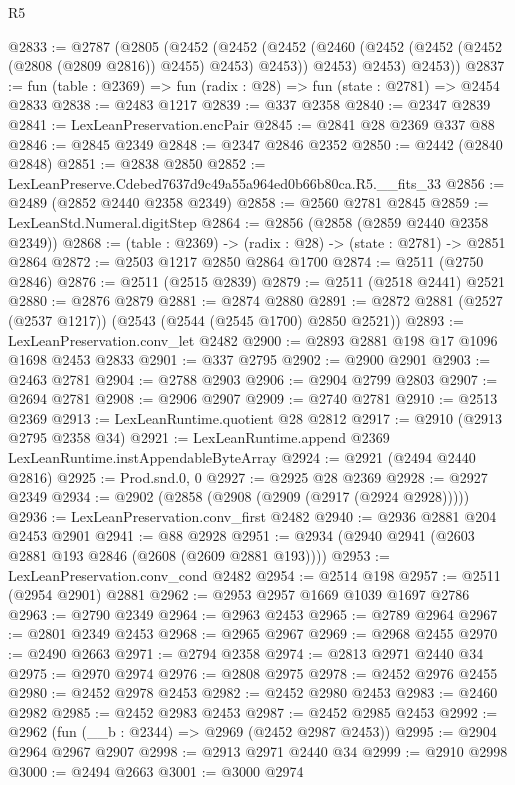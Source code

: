 \begin{lexlean}{R5}
\begin{coremodule}
@2833 := @2787
    (@2805
      (@2452
        (@2452
          (@2452 (@2460 (@2452 (@2452 (@2452 (@2808 (@2809 @2816)) @2455) @2453) @2453)) @2453)
          @2453)
        @2453))
@2837 := fun (table : @2369) => fun (radix : @28) => fun (state : @2781) => @2454 @2833
@2838 := @2483 @1217
@2839 := @337 @2358
@2840 := @2347 @2839
@2841 := LexLeanPreservation.encPair
@2845 := @2841 @28 @2369 @337 @88
@2846 := @2845 @2349
@2848 := @2347 @2846 @2352
@2850 := @2442 (@2840 @2848)
@2851 := @2838 @2850
@2852 := LexLeanPreserve.Cdebed7637d9c49a55a964ed0b66b80ca.R5.__fits_33
@2856 := @2489 (@2852 @2440 @2358 @2349)
@2858 := @2560 @2781 @2845
@2859 := LexLeanStd.Numeral.digitStep
@2864 := @2856 (@2858 (@2859 @2440 @2358 @2349))
@2868 := (table : @2369) -> (radix : @28) -> (state : @2781) -> @2851 @2864
@2872 := @2503 @1217 @2850 @2864 @1700
@2874 := @2511 (@2750 @2846)
@2876 := @2511 (@2515 @2839)
@2879 := @2511 (@2518 @2441) @2521
@2880 := @2876 @2879
@2881 := @2874 @2880
@2891 := @2872 @2881 (@2527 (@2537 @1217)) (@2543 (@2544 (@2545 @1700) @2850 @2521))
@2893 := LexLeanPreservation.conv_let @2482
@2900 := @2893 @2881 @198 @17 @1096 @1698 @2453 @2833
@2901 := @337 @2795
@2902 := @2900 @2901
@2903 := @2463 @2781
@2904 := @2788 @2903
@2906 := @2904 @2799 @2803
@2907 := @2694 @2781
@2908 := @2906 @2907
@2909 := @2740 @2781
@2910 := @2513 @2369
@2913 := LexLeanRuntime.quotient @28 @2812
@2917 := @2910 (@2913 @2795 @2358 @34)
@2921 := LexLeanRuntime.append @2369 LexLeanRuntime.instAppendableByteArray
@2924 := @2921 (@2494 @2440 @2816)
@2925 := Prod.snd.{0, 0}
@2927 := @2925 @28 @2369
@2928 := @2927 @2349
@2934 := @2902 (@2858 (@2908 (@2909 (@2917 (@2924 @2928)))))
@2936 := LexLeanPreservation.conv_first @2482
@2940 := @2936 @2881 @204 @2453 @2901
@2941 := @88 @2928
@2951 := @2934 (@2940 @2941 (@2603 @2881 @193 @2846 (@2608 (@2609 @2881 @193))))
@2953 := LexLeanPreservation.conv_cond @2482
@2954 := @2514 @198
@2957 := @2511 (@2954 @2901) @2881
@2962 := @2953 @2957 @1669 @1039 @1697 @2786
@2963 := @2790 @2349
@2964 := @2963 @2453
@2965 := @2789 @2964
@2967 := @2801 @2349 @2453
@2968 := @2965 @2967
@2969 := @2968 @2455
@2970 := @2490 @2663
@2971 := @2794 @2358
@2974 := @2813 @2971 @2440 @34
@2975 := @2970 @2974
@2976 := @2808 @2975
@2978 := @2452 @2976 @2455
@2980 := @2452 @2978 @2453
@2982 := @2452 @2980 @2453
@2983 := @2460 @2982
@2985 := @2452 @2983 @2453
@2987 := @2452 @2985 @2453
@2992 := @2962 (fun (__b : @2344) => @2969 (@2452 @2987 @2453))
@2995 := @2904 @2964 @2967 @2907
@2998 := @2913 @2971 @2440 @34
@2999 := @2910 @2998
@3000 := @2494 @2663
@3001 := @3000 @2974

\end{coremodule}
\end{lexlean}
